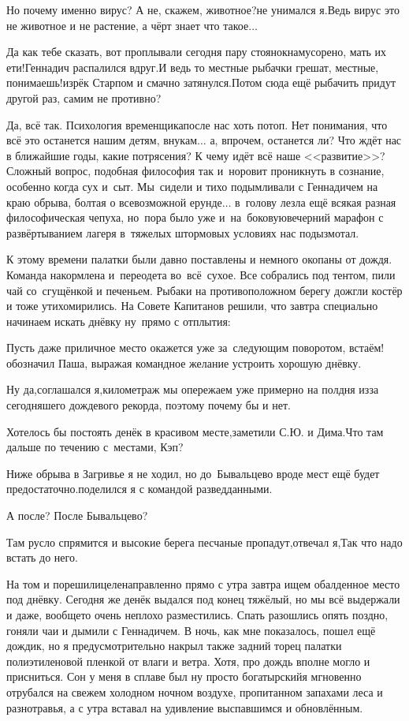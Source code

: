 \diagdash Но почему именно вирус? А не, скажем, животное?\mdash не унимался я.\mdash Ведь вирус это не животное и не растение, а чёрт знает что такое$\ldots$

\diagdash Да как тебе сказать, вот проплывали сегодня пару стоянок\mdash намусорено, мать их ети!\mdash Геннадич распалился вдруг.\mdash И ведь то местные рыбачки грешат, местные, понимаешь!\mdash изрёк Старпом и смачно затянулся.\mdash Потом сюда ещё рыбачить придут другой раз, самим не противно?

Да, всё так. Психология временщика\mdash после нас хоть потоп. Нет понимания, что всё это останется нашим детям, внукам$\ldots$ а, впрочем, останется ли? Что ждёт нас в ближайшие годы, какие потрясения? К чему идёт всё наше <<развитие>>? Сложный вопрос, подобная философия так и~норовит проникнуть в сознание, особенно когда сух и~сыт. Мы~сидели и тихо подымливали с Геннадичем на краю обрыва, болтая о всевозможной ерунде$\ldots$ в~голову лезла ещё всякая разная философическая чепуха, но~пора было уже и~на~боковую\mdash вечерний марафон с развёртыванием лагеря в~тяжелых штормовых условиях нас подызмотал.

К этому времени палатки были давно поставлены и немного окопаны от дождя. Команда накормлена и~переодета во~всё~сухое. Все собрались под тентом, пили чай со~сгущёнкой и печеньем. Рыбаки на противоположном берегу дожгли костёр и тоже утихомирились. На Совете Капитанов решили, что завтра специально начинаем искать днёвку ну~прямо с отплытия:

\diagdash Пусть даже приличное место окажется уже за~следующим поворотом, встаём!\mdash обозначил Паша, выражая командное желание устроить хорошую днёвку.

\diagdash Ну да,\mdash соглашался я,\mdash километраж мы опережаем уже примерно на полдня из\sdash за сегодняшего дождевого рекорда, поэтому почему бы и нет.

\diagdash Хотелось бы постоять денёк в красивом месте,\mdash заметили С.Ю. и Дима.\mdash Что там дальше по течению с~местами, Кэп? 

\diagdash Ниже обрыва в Загривье я не ходил, но до~Бывальцево вроде мест ещё будет предостаточно.\mdash поделился я с командой разведданными.

\diagdash А после? После Бывальцево?

\diagdash Там русло спрямится и высокие берега песчаные пропадут,\mdash отвечал я,\mdash Так что надо встать до него.

На том и порешили\mdash целенаправленно прямо с утра завтра ищем обалденное место под днёвку. Сегодня же денёк выдался под конец тяжёлый, но мы всё выдержали и даже, вообще\sdash то очень неплохо разместились. Спать разошлись опять поздно, гоняли чаи и дымили с Геннадичем. В ночь, как мне показалось, пошел ещё дождик, но я предусмотрительно накрыл также задний торец палатки полиэтиленовой пленкой от влаги и ветра. Хотя, про дождь вполне могло и присниться. Сон у меня в сплаве был ну просто богатырский\mdash я мгновенно отрубался на свежем холодном ночном воздухе, пропитанном запахами леса и разнотравья, а с утра вставал на удивление выспавшимся и обновлённым.%

\begin{center}
\end{center}
